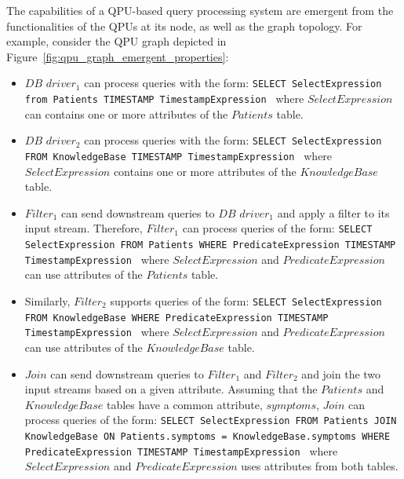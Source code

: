 The capabilities of a QPU-based query processing system are emergent from the functionalities of the QPUs at its node, as well as the
graph topology.
For example, consider the QPU graph depicted in Figure~\ref{fig:qpu_graph_emergent_properties}:
\begin{itemize}

  \item $DB$ $driver_1$ can process queries with the form:
  {\obeylines\obeyspaces
  \texttt{SELECT SelectExpression from Patients TIMESTAMP TimestampExpression
  }}
  where $SelectExpression$ can contains one or more attributes of the $Patients$ table.

\item $DB$ $driver_2$ can process queries with the form:
{\obeylines\obeyspaces
\texttt{SELECT SelectExpression FROM KnowledgeBase TIMESTAMP TimestampExpression
}}
where $SelectExpression$ contains one or more attributes of the $KnowledgeBase$ table.

\item $Filter_1$ can send downstream queries to $DB$ $driver_1$
and apply a filter to its input stream.
Therefore, $Filter_1$ can process queries of the form:
{\obeylines\obeyspaces
\texttt{SELECT SelectExpression FROM Patients
        WHERE PredicateExpression
        TIMESTAMP TimestampExpression
        }}
where $SelectExpression$ and $PredicateExpression$ can use attributes of the $Patients$ table.

\item Similarly, $Filter_2$ supports queries of the form:
{\obeylines\obeyspaces
\texttt{SELECT SelectExpression FROM KnowledgeBase
        WHERE PredicateExpression
        TIMESTAMP TimestampExpression
        }}
where $SelectExpression$ and $PredicateExpression$ can use attributes of the $KnowledgeBase$ table.

\item $Join$ can send downstream queries to $Filter_1$ and $Filter_2$
and join the two input streams based on a given attribute.
Assuming that the $Patients$ and $KnowledgeBase$ tables have a common attribute, $symptoms$,
$Join$ can process queries of the form:
{\obeylines\obeyspaces
\texttt{SELECT SelectExpression
        FROM Patients JOIN KnowledgeBase ON Patients.symptoms = KnowledgeBase.symptoms
        WHERE PredicateExpression
        TIMESTAMP TimestampExpression
        }}
where $SelectExpression$ and $PredicateExpression$ uses attributes from both tables.

\end{itemize}

